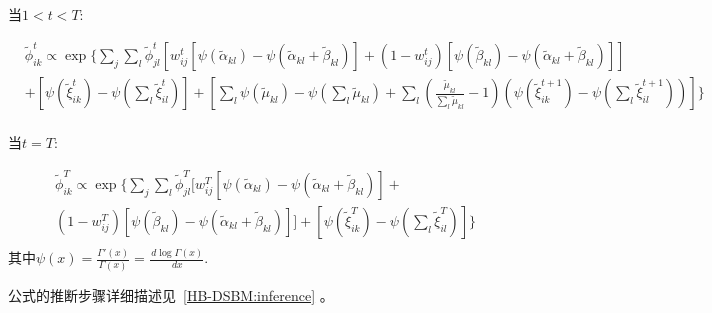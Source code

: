 当\textbf{$1<t<T$}:

\begin{equation}
\label{eq9}
\begin{split}
&\widetilde{\phi}_{ik}^t \propto \exp \{ \sum_j \sum_l \widetilde{\phi}_{jl}^t [w_{ij}^t[\psi(\widetilde{\alpha}_{kl}) - \psi(\widetilde{\alpha}_{kl}+\widetilde{\beta}_{kl})]
+ (1-w_{ij}^t)[\psi(\widetilde{\beta}_{kl})-\psi(\widetilde{\alpha}_{kl}+\widetilde{\beta}_{kl})]]    \\
& + [\psi(\widetilde{\xi}_{ik}^t) - \psi(\sum_l \widetilde{\xi}_{il}^t)]+ [\sum_l \psi(\widetilde{\mu}_{kl}) - \psi(\sum_l \widetilde{\mu}_{kl}) 
+\sum_l (\frac{\widetilde{\mu}_{kl}}{\sum_l \widetilde{\mu}_{kl}} -1)(\psi(\widetilde{\xi}_{ik}^{t+1}) - \psi(\sum_l \widetilde{\xi}_{il}^{t+1}))]  \}\\
\end{split}
\end{equation} 

当\textbf{$t=T$}:

\begin{equation}
\label{eq10}
\begin{split}
&\widetilde{\phi}_{ik}^T \propto \exp \{ \sum_j \sum_l \widetilde{\phi}_{jl}^T [w_{ij}^T[\psi(\widetilde{\alpha}_{kl}) - \psi(\widetilde{\alpha}_{kl}+\widetilde{\beta}_{kl})] + \\
&(1-w_{ij}^T)[\psi(\widetilde{\beta}_{kl})-\psi(\widetilde{\alpha}_{kl}+\widetilde{\beta}_{kl})]]  + [\psi(\widetilde{\xi}_{ik}^T) - \psi(\sum_l \widetilde{\xi}_{il}^T)]\}  \\
\end{split}
\end{equation} 
其中$\psi(x) = \frac{\Gamma'(x)}{\Gamma(x)} = \frac{\,d \log \Gamma(x)}{\, dx}$.

公式的推断步骤详细描述见~\ref{HB-DSBM:inference} 。




